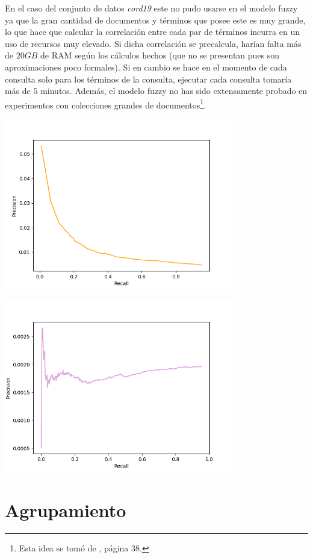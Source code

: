 \documentclass{llncs}
\begin{document}
	En el caso del conjunto de datos \emph{cord19} este no pudo usarse en el modelo fuzzy ya que la gran cantidad de documentos y t\'erminos que posee este es muy grande, lo que hace que calcular la correlaci\'on entre cada par de t\'erminos incurra en un uso de recursos muy elevado. Si dicha correlaci\'on se precalcula, har\'ian falta m\'as de $20 GB$ de RAM seg\'un los c\'alculos hechos (que no se presentan pues son aproximaciones poco formales). Si en cambio se hace en el momento de cada consulta solo para los t\'erminos de la consulta, ejecutar cada consulta tomar\'ia m\'as de $5$ minutos. Adem\'as, el modelo fuzzy no has sido extensamente probado en experimentos con colecciones grandes de documentos\footnote{Esta idea se tom\'o de \cite{B2}, p\'agina $38$.}.
	
	\begin{center}
		\includegraphics[width=10cm]{cranfield_fuzzy}
		
		\includegraphics[width=10cm]{vaswani_fuzzy}
	\end{center}	
	
    \section{Agrupamiento}
	
\end{document}
